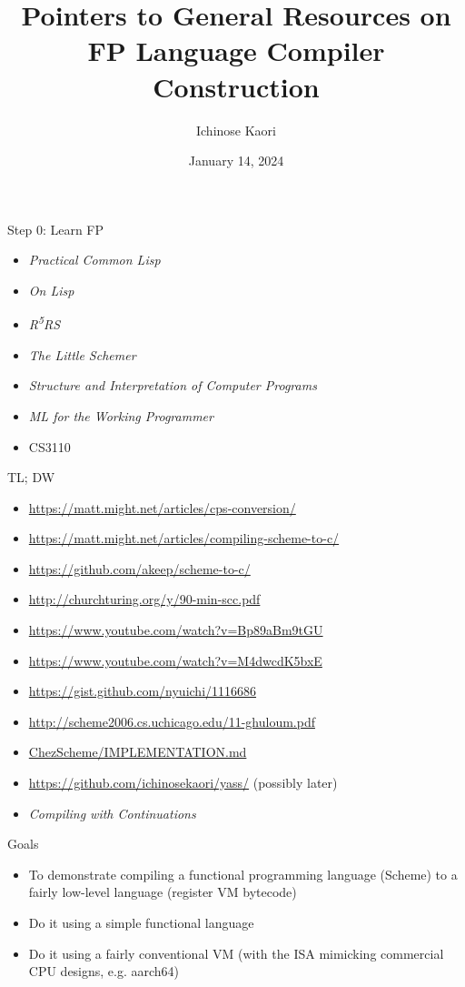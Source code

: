 \documentclass{beamer}
\title[Compiling FP]{Pointers to General Resources on FP Language Compiler Construction}
\author{Ichinose Kaori}
\date{January 14, 2024}
\begin{document}
\maketitle

\begin{frame}{Step 0: Learn FP}
  \begin{itemize}
  \item \textit{Practical Common Lisp}
  \item \textit{On Lisp}
  \item \textit{R\textsuperscript{5}RS}
  \item \textit{The Little Schemer}
  \item \textit{Structure and Interpretation of Computer Programs}
  \item \textit{ML for the Working Programmer}
  \item CS3110
  \end{itemize}
\end{frame}

\begin{frame}{TL; DW}
  \begin{itemize}
  \item \url{https://matt.might.net/articles/cps-conversion/}
  \item \url{https://matt.might.net/articles/compiling-scheme-to-c/}
  \item \url{https://github.com/akeep/scheme-to-c/}
  \item \url{http://churchturing.org/y/90-min-scc.pdf}
  \item \url{https://www.youtube.com/watch?v=Bp89aBm9tGU}
  \item \url{https://www.youtube.com/watch?v=M4dwcdK5bxE}
  \item \url{https://gist.github.com/nyuichi/1116686}
  \item \url{http://scheme2006.cs.uchicago.edu/11-ghuloum.pdf}
  \item \href{https://github.com/cisco/ChezScheme/blob/main/IMPLEMENTATION.md}{ChezScheme/IMPLEMENTATION.md}
  \item \url{https://github.com/ichinosekaori/yass/} (possibly later)
  \item \textit{Compiling with Continuations}
  \end{itemize}
\end{frame}

\begin{frame}{Goals}
  \begin{itemize}
    \item To demonstrate compiling a functional programming language (Scheme) to a fairly low-level language (register VM bytecode)
    \item Do it using a simple functional language
    \item Do it using a fairly conventional VM (with the ISA mimicking commercial CPU designs, e.g. aarch64)
  \end{itemize}
\end{frame}
\end{document}
